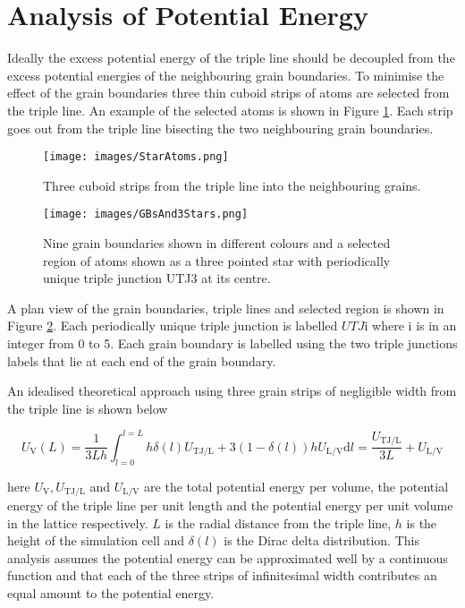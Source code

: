 \documentclass[12pt,a4paper,openany]{report}
\newcommand{\ts}[1]{\textrm{#1}}
\begin{document}
\newpage
\section{Analysis of Potential Energy}


Ideally the excess potential energy of the triple line should be decoupled from the excess potential energies of the neighbouring grain boundaries. To minimise the effect of the grain boundaries three thin cuboid strips of atoms are selected from the triple line. An example of the selected atoms is shown in Figure \ref{fig:StarAtoms}. Each strip goes out from the triple line bisecting the two neighbouring grain boundaries. 

\begin{figure}[H]
	\centering
	\texttt{[image: images/StarAtoms.png]} 
	\caption{Three cuboid strips from the triple line into the
	neighbouring grains.}
	\label{fig:StarAtoms}
\end{figure}

\begin{figure}[H]
	\centering
	\texttt{[image: images/GBsAnd3Stars.png]} 
	\caption{Nine grain boundaries shown in different colours and a selected region of atoms shown as a three pointed star with periodically unique triple junction UTJ3 at its centre.}   
	\label{fig:GBsandStar}
\end{figure}


A plan view of the grain boundaries, triple lines and selected region is shown in Figure \ref{fig:GBsandStar}. Each periodically unique triple junction is labelled $UTJ\ts{i}$ where $\ts{i}$ is in an integer from 0 to 5. Each grain boundary is labelled using the two triple junctions labels that lie at each end of the grain boundary.


An idealised theoretical approach using three grain strips of negligible width from the triple line is shown below 

\[ U_{\ts{V}}(L) =\frac{1}{3 L h}\int_{l=0}^{l=L} h \delta(l) U_{\ts{TJ/L}} + 3(1-\delta(l) ) h U_{\ts{L/V}}  \text{d}l = \frac{U_{\ts{TJ/L}}}{3L}  + U_{\ts{L/V}} 
\label{eq:L1}
\]

here $U_{\ts{V}}, U_{\ts{TJ/L}}$ and  $U_{\ts{L/V}} $ are the total potential energy per volume, the potential energy of the triple line per unit length and the potential energy per unit volume in the lattice respectively. $L$ is the radial distance from the triple line, $h$ is the height of the simulation cell and $\delta(l)$ is the Dirac delta distribution. This analysis assumes the potential energy can be approximated well by a continuous function and that each of the three strips of infinitesimal width contributes an equal amount to the potential energy.
\end{document}

